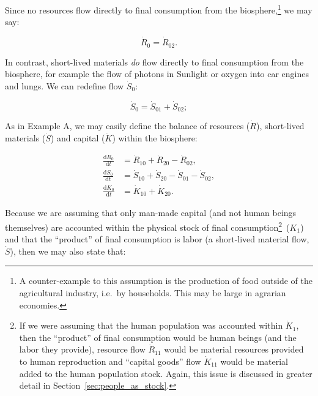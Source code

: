Since no resources flow directly to final consumption 
from the biosphere,\footnote{A counter-example
to this assumption is the production of food
outside of the agricultural industry, 
i.e.\ by households. 
This may be large in agrarian economies.}
 we may say:

\begin{equation}\label{eq:B_R0}
	\dot{R}_{0} = \dot{R}_{02}.
\end{equation}

In contrast, 
short-lived materials \emph{do} flow directly to final consumption 
from the biosphere, 
for example the flow of photons in Sunlight or 
oxygen into car engines and lungs. 
We can redefine flow $\dot{S}_{0}$:

\begin{equation}\label{eq:B_S0}
	\dot{S}_{0} 
	= \dot{S}_{01} + \dot{S}_{02};
\end{equation}

As in Example A, we may easily define 
the balance of resources ($\dot{R}$),
short-lived materials ($\dot{S}$) and
capital ($\dot{K}$) within the biosphere:

\begin{align}\label{eq:B_dR0}
	\frac{\mathrm{d}R_{0}}{\mathrm{d}t}	&
	= \dot{R}_{10}
	+ \dot{R}_{20}
	- \dot{R}_{02},										\\
\label{eq:B_dS0}
	\frac{\mathrm{d}S_{0}}{\mathrm{d}t}	&
	= \dot{S}_{10}
	+ \dot{S}_{20}
	- \dot{S}_{01}
	- \dot{S}_{02},										\\	
\label{eq:B_dK0}
	\frac{\mathrm{d}K_{0}}{\mathrm{d}t}	&
	= \dot{K}_{10}
	+ \dot{K}_{20}.
\end{align}

Because we are assuming that only man-made capital
(and not human beings themselves)
are accounted within the physical stock of 
final consumption\footnote{If
we were assuming that the human population
was accounted within $\dot{K}_{1}$,
then the ``product'' of final consumption would be human beings
(and the labor they provide),
resource flow $\dot{R}_{11}$ would be material resources
provided to human reproduction and
``capital goods'' flow $\dot{K}_{11}$ would be material
added to the human population stock. Again, 
this issue is discussed in greater detail in 
Section~\ref{sec:people_as_stock}.
}~($K_{1}$)
and that the ``product'' of final consumption is labor
(a short-lived material flow, $\dot{S}$),
then we may also state that:

